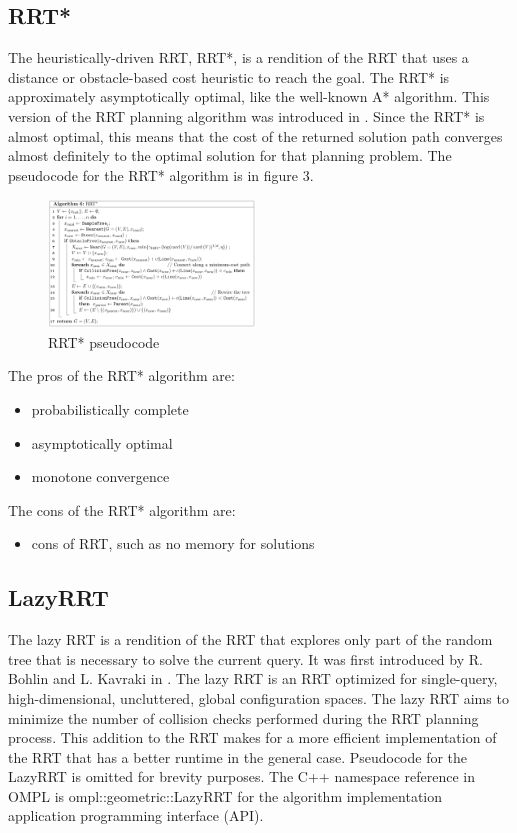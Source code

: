 \documentclass[conference]{IEEEtran} \usepackage[T1]{fontenc} \usepackage[backend=biber, style=ieee]{biblatex}
\begin{document}
\subsection{RRT*} \label{RRT*}
The heuristically-driven RRT, RRT*, is a rendition of the RRT that uses a distance or obstacle-based cost heuristic to reach the goal. The RRT* is approximately 
asymptotically optimal, like the well-known A* algorithm. This version of the RRT planning algorithm was introduced in \cite{sampling_star}. Since the RRT* is almost
optimal, this means that the cost of the returned solution path converges almost definitely to the optimal solution for that planning problem. The pseudocode for the
RRT* algorithm is in figure 3.

\begin{figure}
\label{figure3} 
\centering 
\includegraphics[width=0.49\textwidth]{rrt_star}
\caption{RRT* pseudocode}
\end{figure}

The pros of the RRT* algorithm are:
\begin{itemize}
\item probabilistically complete
\item asymptotically optimal
\item monotone convergence
\end{itemize}

The cons of the RRT* algorithm are:
\begin{itemize}
\item cons of RRT, such as no memory for solutions
\end{itemize}


\subsection{LazyRRT} \label{LazyRRT}
The lazy RRT is a rendition of the RRT that explores only part of the random tree that is necessary to solve the current query. It was first introduced by R. Bohlin and 
L. Kavraki in \cite{lazy_rrt}. The lazy RRT is an RRT optimized for single-query, high-dimensional, uncluttered, global configuration spaces. The lazy RRT aims to 
minimize the number of collision checks performed during the RRT planning process. This addition to the RRT makes for a more efficient implementation of the RRT that has 
a better runtime in the general case. Pseudocode for the LazyRRT is omitted for brevity purposes. The C++ namespace reference in OMPL is ompl::geometric::LazyRRT for
the algorithm implementation application programming interface (API).
\end{document}
